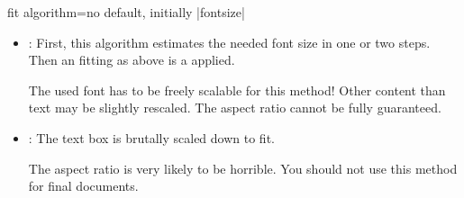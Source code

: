 \begin{docTcbKey}{fit algorithm}{=}{no default, initially |fontsize|}
\begin{itemize}
    First, this algorithm estimates the needed font size in one or two steps.
    Then an  fitting as above is a applied.
    \begin{marker}
    The used font has to be freely scalable for this method!
    Other content than text may be slightly rescaled.
    The aspect ratio cannot be fully guaranteed.
    \end{marker}
  \item{}:
    First, this algorithm estimates the needed font size in one or two steps.
    Then an  fitting as above is a applied.
    \begin{marker}
    The used font has to be freely scalable for this method!
    Other content than text may be slightly rescaled.
    The aspect ratio cannot be fully guaranteed.
    \end{marker}
  \item{}:
    The text box is brutally scaled down to fit.
    \begin{marker}
    The aspect ratio is very likely to be horrible.
    You should not use this method for final documents.
    \end{marker}
\end{itemize}


\end{docTcbKey}




